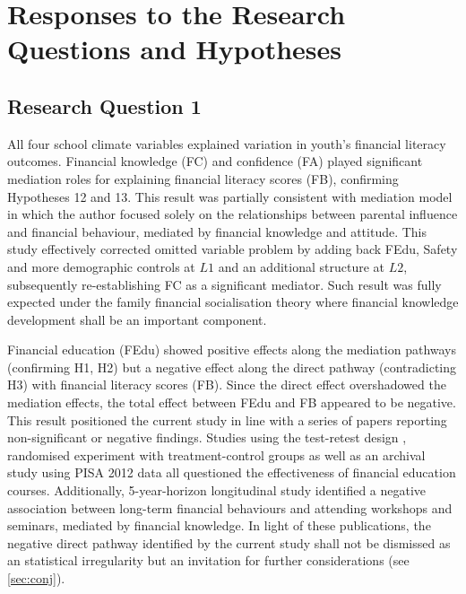 \documentclass[a4paper,11pt,UKenglish,twoside,openright]{report}\usepackage[]{graphicx}\usepackage[]{color}
\begin{document}
\section{Responses to the Research Questions and Hypotheses}

\subsection{Research Question 1}

All four school climate variables explained variation in youth's financial literacy outcomes. Financial knowledge (FC) and confidence (FA) played significant mediation roles for explaining financial literacy scores (FB), confirming Hypotheses 12 and 13. This result was partially consistent with  mediation model in which the author focused solely on the relationships between parental influence and financial behaviour, mediated by financial knowledge and attitude. This study effectively corrected  omitted variable problem by adding back FEdu, Safety and more demographic controls at $L1$ and an additional structure at $L2$, subsequently re-establishing FC as a significant mediator. Such result was fully expected under the family financial socialisation theory \parencite{danes:2007} where financial knowledge development shall be an important component.

Financial education (FEdu) showed positive effects along the mediation pathways (confirming H1, H2) but a negative effect along the direct pathway (contradicting H3) with financial literacy scores (FB). Since the direct effect overshadowed the mediation effects, the total effect between FEdu and FB appeared to be negative. This result positioned the current study in line with a series of papers reporting non-significant or negative findings. Studies using the test-retest design \parencite{mandell:2009}, randomised experiment with treatment-control groups \parencite{becchetti:2013, collins:2013} as well as an archival study using PISA 2012 data \parencite{farinella:2017} all questioned the effectiveness of financial education courses. Additionally,  5-year-horizon longitudinal study identified a negative association between long-term financial behaviours and attending workshops and seminars, mediated by financial knowledge. In light of these publications, the negative direct pathway identified by the current study shall not be dismissed as an statistical irregularity but an invitation for further considerations (see \cref{sec:conj}).
\end{document}

